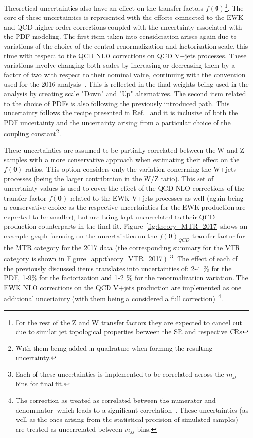 \hspace{10pt} Theoretical uncertainties also have an effect on the transfer factors $f(\boldsymbol{\theta})$\footnote{For the rest of the Z and W transfer factors they are expected to cancel out due to similar jet topological properties between the SR and respective CRs}. The core of these uncertainties is represented with the effects connected to the EWK and QCD higher order corrections coupled with the uncertainty associated with the PDF modeling. The first item taken into consideration arises again due to variations of the choice of the central renormalization and factorization scale, this time with respect to the QCD NLO corrections on QCD V+jets processes. These variations involve changing both scales by increasing or decreasing them by a factor of two with respect to their nominal value, continuing with the convention used for the 2016 analysis~\cite{paper:HIG_17_023}. This is reflected in the final weights being used in the analysis by creating scale "Down" and "Up" alternatives. The second item related to the choice of PDFs is also following the previously introduced path. This uncertainty follows the recipe presented in Ref.~\cite{paper:pdf4lhc} and it is inclusive of both the PDF uncertainty and the uncertainty arising from a particular choice of the coupling constant\footnote{With them being added in quadrature when forming the resulting uncertainty.}. 

\hspace{10pt} These uncertainties are assumed to be partially correlated between the W and Z samples with a more conservative approach when estimating their effect on the $f(\boldsymbol{\theta})$ ratios. This option considers only the variation concerning the W+jets processes (being the larger contribution in the W/Z ratio). This set of uncertainty values is used to cover the effect of the QCD NLO corrections of the transfer factor $f(\boldsymbol{\theta})$ related to the EWK V+jets processes as well (again being a conservative choice as the respective uncertainties for the EWK production are expected to be smaller), but are being kept uncorrelated to their QCD production counterparts in the final fit. Figure~\ref{fig:theory_MTR_2017} shows an example graph focusing on the uncertainties on the $f(\boldsymbol{\theta})_{QCD}$ transfer factor for the MTR category for the 2017 data (the corresponding summary for the VTR category is shown in Figure~\ref{app:theory_VTR_2017})~\footnote{Each of these uncertainties is implemented to be correlated across the $m_{jj}$ bins for final fit.}. The effect of each of the previously discussed items translates into uncertainties of:  2-4~\% for the PDF, 1-9\% for the factorization and 1-2~\% for the renormalization variation. The EWK NLO corrections on the QCD V+jets production are implemented as one additional uncertainty (with them being a considered a full correction)~\footnote{The correction as treated as correlated between the numerator and denominator, which leads to a significant correlation~\cite{note:AN_19_257}. These uncertainties (as well as the ones arising from the statistical precision of simulated samples) are treated as uncorrelated between $m_{jj}$ bins.}. %


